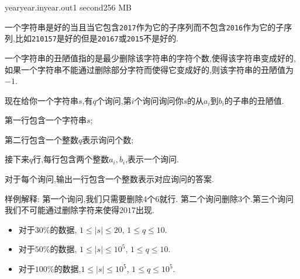 \documentclass[11pt,a4paper,oneside]{article}
\begin{document}
\begin{problem}{year}{year.in}{year.out}{1 second}{256 MB}

    一个字符串是好的当且当它包含\verb|2017|作为它的子序列而不包含\verb|2016|作为它的子序列,比如\verb|210157|是好的但是\verb|20167|或\verb|2015|不是好的.
    
    一个字符串的丑陋值指的是最少删除该字符串的字符个数,使得该字符串变成好的,如果一个字符串不能通过删除部分字符而使得它变成好的,则该字符串的丑陋值为$-1$.
    
    现在给你一个字符串$s$,有$q$个询问,第$i$个询问询问你$s$的从$a_i$到$b_i$的子串的丑陋值.
    
    \InputFile

	第一行包含一个字符串$s$;
	
	第二行包含一个整数$q$表示询问个数;
	
	接下来$q$行,每行包含两个整数$a_i,b_i$,表示一个询问.

    \OutputFile
    
    对于每个询问,输出一行包含一个整数表示对应询问的答案.

    \Example

    \begin{example}
    \end{example}

	样例解释: 第一个询问,我们只需要删除$4$个$6$就行. 第二个询问删除$3$个.第三个询问我们不可能通过删除字符来使得$2017$出现.

	\begin{example}
	\end{example}

	\begin{example}
	\exmp{
		1234
		2
		2 4
		1 2
	}{
		-1
		-1
	}%
	\end{example}

    \Note
    \begin{itemize}
    	\item 对于$30\%$的数据, $1 \leq \vert s \vert \leq 20$, $1 \leq q \leq 10$.
    	\item 对于$50\%$的数据, $1 \leq \vert s \vert \leq 10^5$, $1 \leq q \leq 10$.
        \item 对于$100\%$的数据,$1 \leq \vert s \vert \leq 10^5$, $1 \leq q \leq 10^5$.
    \end{itemize}

\end{problem}
\end{document}
